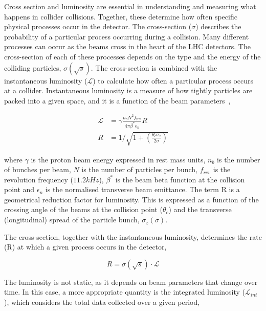 Cross section and luminosity are essential in understanding and measuring what happens in collider collisions. Together, these determine how often specific physical processes occur in the detector. The cross-section ($\sigma$) describes the probability of a particular process occurring during a collision. Many different processes can occur as the beams cross in the heart of the LHC detectors. The cross-section of each of these processes depends on the type and the energy of the colliding particles, $\sigma(\sqrt{s})$. The cross-section is combined with the instantaneous luminosity ($\mathscr{L}$) to calculate how often a particular process occurs at a collider. Instantaneous luminosity is a measure of how tightly particles are packed into a given space, and it is a function of the beam parameters~\cite{LHC_HL},

\begin{equation}
\begin{aligned}
    \mathscr{L} &= \gamma \frac{n_b N^2 f_{\text{rev}}}{4\pi \beta^* \epsilon_n} R \\
    R &= 1 / \sqrt{1 + \left( \frac{\theta_c \sigma_z}{2\sigma} \right) }
\end{aligned}
\end{equation}

where $\gamma$ is the proton beam energy expressed in rest mass units, $n_b$ is the number of bunches per beam, $N$ is the number of particles per bunch, $f_{rev}$ is the revolution frequency ($11.2\unit{kHz}$), $\beta^*$ is the beam beta function at the collision point and $\epsilon_n$ is the normalised transverse beam emittance. The term R is a geometrical reduction factor for luminosity. This is expressed as a function of the crossing angle of the beams at the collision point ($\theta_c$) and the transverse (longitudinal) spread of the particle bunch, $\sigma_z(\sigma)$. 

The cross-section, together with the instantaneous luminosity, determines the rate (R) at which a given process occurs in the detector,

\begin{equation}
    R = \sigma(\sqrt{s}) \cdot \mathscr{L} 
\end{equation}

The luminosity is not static, as it depends on beam parameters that change over time. In this case, a more appropriate quantity is the integrated luminosity ($\mathscr{L}_{int}$), which considers the total data collected over a given period,

